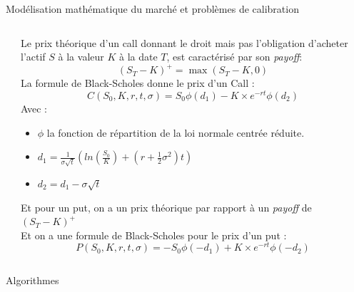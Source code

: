 \documentclass[final]{beamer}
\newlength{\onecolwid}
\newlength{\twocolwid}
\begin{document}
\begin{frame}[t]
\begin{columns}[t]
\begin{column}{\twocolwid}
\begin{block}{Modélisation mathématique du marché et problèmes de calibration}
\begin{columns}[t,totalwidth=\twocolwid]
\begin{column}{\onecolwid}

\end{column} %

\begin{column}{\onecolwid} %


Le prix théorique d'un call donnant le droit mais pas l'obligation d'acheter l'actif $S$ à la valeur $K$ à la date $T$, est caractérisé par son \textit{payoff}:
$$ (S_T - K)^{+} = \max (S_T -K,0) $$
La formule de Black-Scholes donne le prix d'un Call :
$$ C(S_0,K,r,t,\sigma) = S_0 \phi(d_1)-K \times e^{-rt} \phi(d_2) $$
Avec : \begin{itemize}
\item $\phi$ la fonction de répartition de la loi normale centrée réduite.
\item $d_1 = \frac{1}{\sigma \sqrt{t}} (ln(\frac{S_0}{K})+(r+\frac{1}{2}\sigma^2)t) $
\item $d_2 = d_1 - \sigma \sqrt{t}$
\end{itemize}
Et pour un put, on a un prix théorique par rapport à un \textit{payoff} de $ (S_T - K)^{+}$
\\ \vspace{0.5cm}
Et on a une formule de Black-Scholes pour le prix d'un put :
$$ P(S_0,K,r,t,\sigma) = -S_0 \phi(-d_1)+K \times e^{-rt} \phi(-d_2) $$

\end{column} %

\end{columns} %

\end{block}


\vspace{-2cm}
\begin{alertblock}{Algorithmes}



\end{alertblock}
\end{column}
\end{columns}
\end{frame}
\end{document}
